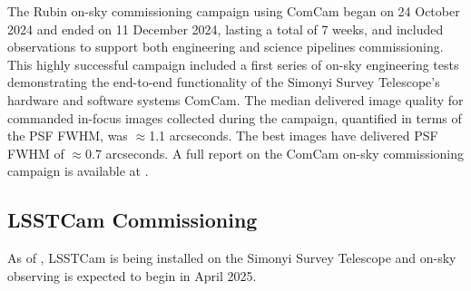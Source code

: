 The Rubin on-sky commissioning campaign using ComCam began on 24 October 2024 and ended on 11 December 2024, lasting a total of 7 weeks, and included observations to support both engineering and science pipelines commissioning.
This highly successful campaign included a first series of on-sky engineering tests demonstrating the end-to-end functionality of the Simonyi Survey Telescope’s hardware and software systems ComCam.
The median delivered image quality  for commanded in-focus images collected during the campaign, quantified in terms of the PSF FWHM, was $\approx$1.1 arcseconds. 
The best images have delivered PSF FWHM of $\approx$0.7 arcseconds.
A full report on the ComCam on-sky commissioning campaign is available at .


\subsection{LSSTCam Commissioning}
\label{ssec:commissioning-lsstcam}

As of \currentdate, LSSTCam is being installed on the Simonyi Survey Telescope and on-sky observing is expected to begin in April 2025.


